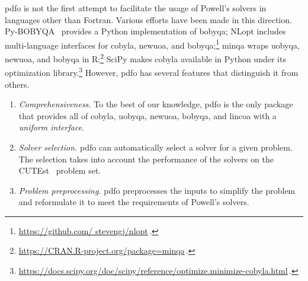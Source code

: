 \documentclass[
    smallextended,  %
    final,          %
]{svjour3}
\newcommand{\aeq}{A_{\scriptscriptstyle\text{E}}}
\newcommand{\beq}{b_{\scriptscriptstyle\text{E}}}
\begin{document}
\gls{pdfo} is not the first attempt to facilitate the usage of Powell's solvers in languages other than Fortran.
Various efforts have been made in this direction.
Py-BOBYQA~\cite{Cartis_Etal_2019,Cartis_Roberts_Sheridan-Methven_2022} provides a Python
implementation of \gls{bobyqa};
NLopt includes multi-language interfaces for \gls{cobyla}, \gls{newuoa}, and \gls{bobyqa};\footnote{\url{https://github.com/ stevengj/nlopt}\,.}
minqa wraps \gls{uobyqa}, \gls{newuoa}, and \gls{bobyqa} in R;\footnote{\url{https://CRAN.R-project.org/package=minqa}\,.}
SciPy makes \gls{cobyla} available in Python under its optimization library.\footnote{\url{https://docs.scipy.org/doc/scipy/reference/optimize.minimize-cobyla.html}\,.}
However, \gls{pdfo} has several features that distinguish it from others.
\begin{enumerate}
    \item \emph{Comprehensiveness.}
    To the best of our knowledge, \gls{pdfo} is the only package that provides all of \gls{cobyla},
    \gls{uobyqa}, \gls{newuoa}, \gls{bobyqa}, and \gls{lincoa} with a \emph{uniform interface}.

    \item \emph{Solver selection.}
    \gls{pdfo} can automatically select a solver for a given problem.
    The selection takes into account the performance of the solvers on the
    CUTEst~\cite{Gould_Orban_Toint_2015} problem set.

    \item \emph{Problem preprocessing.}
    \gls{pdfo} preprocesses the inputs to simplify the problem and reformulate it to meet the requirements of Powell's solvers.


\end{enumerate}
\end{document}
